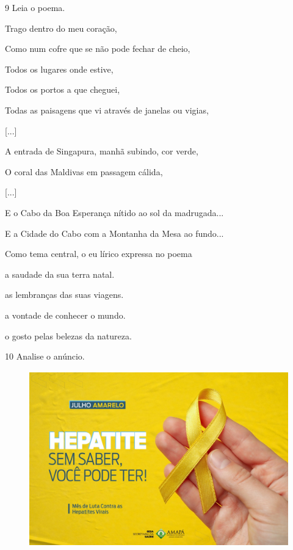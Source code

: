 \pagebreak

\num{9} Leia o poema.

\begin{myquote}
Trago dentro do meu coração,

Como num cofre que se não pode fechar de cheio,

Todos os lugares onde estive,

Todos os portos a que cheguei,

Todas as paisagens que vi através de janelas ou vigias,

{[}...{]}

A entrada de Singapura, manhã subindo, cor verde,

O coral das Maldivas em passagem cálida,

{[}...{]}

E o Cabo da Boa Esperança nítido ao sol da madrugada...

E a Cidade do Cabo com a Montanha da Mesa ao fundo...

\end{myquote}

Como tema central, o eu lírico expressa no poema

\begin{escolha}
\item a saudade da sua terra natal.

\item as lembranças das suas viagens.

\item a vontade de conhecer o mundo.

\item o gosto pelas belezas da natureza.
\end{escolha}

\num{10} Analise o anúncio.

\begin{figure}[H]
\centering
\includegraphics[height=3in]{./imgSAEB_8_POR/media/image31.png}
\end{figure}

